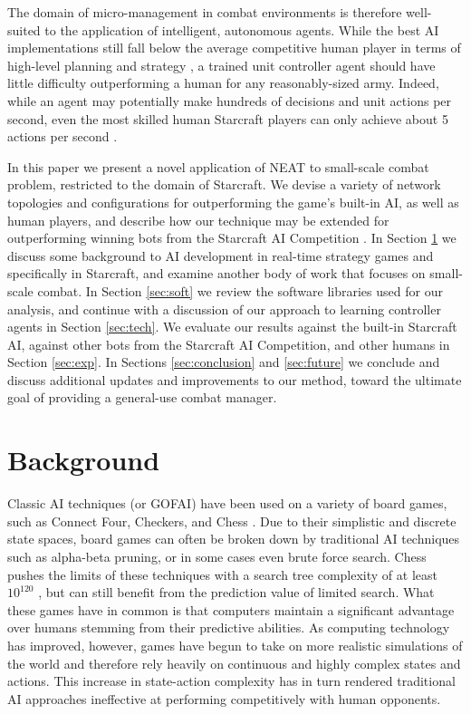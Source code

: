 \documentclass[10pt,a4paper,twocolumn]{article}
\begin{document}
The domain of micro-management in combat environments is therefore well-suited to the application of intelligent, autonomous agents. While the best AI implementations still fall below the average competitive human player in terms of high-level planning and strategy \cite{weber2011building}, a trained unit controller agent should have little difficulty outperforming a human for any reasonably-sized army. Indeed, while an agent may potentially make hundreds of decisions and unit actions per second, even the most skilled human Starcraft players can only achieve about 5 actions per second \cite{mccoy2008integrated}.

In this paper we present a novel application of NEAT to small-scale combat problem, restricted to the domain of Starcraft. We devise a variety of network topologies and configurations for outperforming the game's built-in AI, as well as human players, and describe how our technique may be extended for outperforming winning bots from the Starcraft AI Competition \cite{ai_competition}. In Section \ref{sec:back} we discuss some background to AI development in real-time strategy games and specifically in Starcraft, and examine another body of work that focuses on small-scale combat. In Section \ref{sec:soft} we review the software libraries used for our analysis, and continue with a discussion of our approach to learning controller agents in Section \ref{sec:tech}. We evaluate our results against the built-in Starcraft AI, against other bots from the Starcraft AI Competition, and other humans in Section \ref{sec:exp}. In Sections \ref{sec:conclusion} and \ref{sec:future} we conclude and discuss additional updates and improvements to our method, toward the ultimate goal of providing a general-use combat manager.

\section{Background}
\label{sec:back}

Classic AI techniques (or GOFAI) have been used on a variety of board games, such as Connect Four, Checkers, and Chess \cite{Allis94searchingfor}. Due to their simplistic and discrete state spaces, board games can often be broken down by traditional AI techniques such as alpha-beta pruning, or in some cases even brute force search. Chess pushes the limits of these techniques with a search tree complexity of at least $10^{120}$ \cite{Shannon:1988:PCP:61701.67002}, but can still benefit from the prediction value of limited search. What these games have in common is that computers maintain a significant advantage over humans stemming from their predictive abilities. As computing technology has improved, however, games have begun to take on more realistic simulations of the world and therefore rely heavily on continuous and highly complex states and actions. This increase in state-action complexity has in turn rendered traditional AI approaches ineffective at performing competitively with human opponents.
\end{document}
